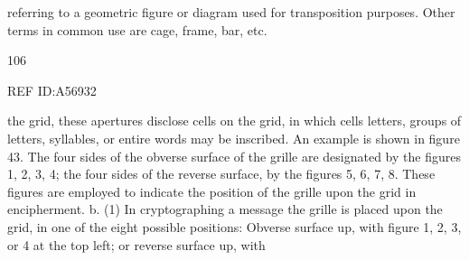referring to a geometric ﬁgure or diagram used for transposition purposes. Other terms in
common use are cage, frame, bar, etc.

106

 

REF ID:A56932

the grid, these apertures disclose cells on the grid, in which cells letters,
groups of letters, syllables, or entire words may be inscribed. An example
is shown in ﬁgure 43. The four sides of the obverse surface of the grille
are designated by the ﬁgures 1, 2, 3, 4; the four sides of the reverse
surface, by the ﬁgures 5, 6, 7, 8. These ﬁgures are employed to indicate
the position of the grille upon the grid in encipherment.
b. (1) In cryptographing a message the grille is placed upon the grid,
in one of the eight possible positions: Obverse surface up, with
ﬁgure 1, 2, 3, or 4 at the top left; or reverse surface up, with

 

 

 

 

 

 

 

 

 

 

 

 

 

 

 

 

 

 

 

 

 

 

 

 

 

 

 

 

 

 

 

 

 

 

 

 

 

 

